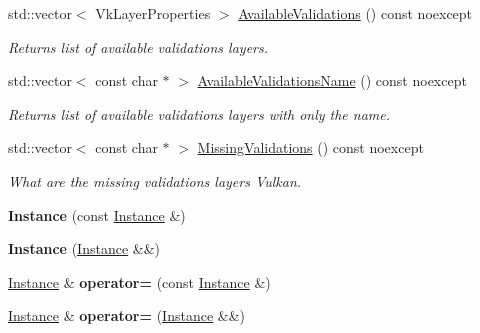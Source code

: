 \begin{DoxyCompactItemize}
\hypertarget{classae_1_1_instance_a6b46129d8c0b5d204eab1a1cecb5b221}{}\label{classae_1_1_instance_a6b46129d8c0b5d204eab1a1cecb5b221} 
std\+::vector$<$ Vk\+Layer\+Properties $>$ \hyperlink{classae_1_1_instance_a6b46129d8c0b5d204eab1a1cecb5b221}{Available\+Validations} () const noexcept
\begin{DoxyCompactList}\small\item\em Returns list of available validations layers. \end{DoxyCompactList}\item 
\hypertarget{classae_1_1_instance_a3439df7740449cf58fe3613c957b359f}{}\label{classae_1_1_instance_a3439df7740449cf58fe3613c957b359f} 
std\+::vector$<$ const char $\ast$ $>$ \hyperlink{classae_1_1_instance_a3439df7740449cf58fe3613c957b359f}{Available\+Validations\+Name} () const noexcept
\begin{DoxyCompactList}\small\item\em Returns list of available validations layers with only the name. \end{DoxyCompactList}\item 
std\+::vector$<$ const char $\ast$ $>$ \hyperlink{classae_1_1_instance_aa76edbae91362fadb47c743b6f4298be}{Missing\+Validations} () const noexcept
\begin{DoxyCompactList}\small\item\em What are the missing validations layers Vulkan. \end{DoxyCompactList}\end{DoxyCompactItemize}
{\bf }\par
\begin{DoxyCompactItemize}
\item 
\hypertarget{classae_1_1_instance_a48d480419ea5ee601db2bacf7b6d48d2}{}\label{classae_1_1_instance_a48d480419ea5ee601db2bacf7b6d48d2} 
{\bfseries Instance} (const \hyperlink{classae_1_1_instance}{Instance} \&)
\item 
\hypertarget{classae_1_1_instance_ac0b8b262e4aa1e2ff3eb0e8839f9868c}{}\label{classae_1_1_instance_ac0b8b262e4aa1e2ff3eb0e8839f9868c} 
{\bfseries Instance} (\hyperlink{classae_1_1_instance}{Instance} \&\&)
\item 
\hypertarget{classae_1_1_instance_ad01e1dd78cb36b0a112770281a836f19}{}\label{classae_1_1_instance_ad01e1dd78cb36b0a112770281a836f19} 
\hyperlink{classae_1_1_instance}{Instance} \& {\bfseries operator=} (const \hyperlink{classae_1_1_instance}{Instance} \&)
\item 
\hypertarget{classae_1_1_instance_a2d73116829ee705a15c32f9e7c113524}{}\label{classae_1_1_instance_a2d73116829ee705a15c32f9e7c113524} 
\hyperlink{classae_1_1_instance}{Instance} \& {\bfseries operator=} (\hyperlink{classae_1_1_instance}{Instance} \&\&)
\end{DoxyCompactItemize}


